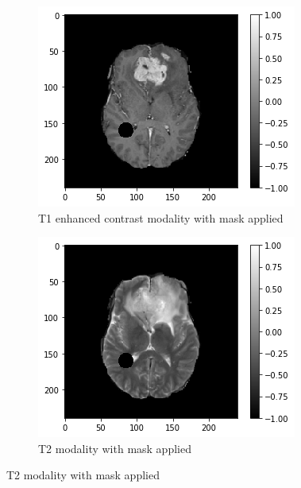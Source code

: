 \begin{figure}[H]
    \centering
    \begin{subfigure}[t]{.33\textwidth}
        \centering
        \includegraphics[width=\linewidth]{chapters/06_hdm/images_masked/masked_1.png}
        \caption{T1 enhanced contrast modality with mask applied}
    \end{subfigure}%
    \begin{subfigure}[t]{.33\textwidth}
        \centering
        \includegraphics[width=\linewidth]{chapters/06_hdm/images_masked/masked_2.png}
        \caption{T2 modality with mask applied}
    \end{subfigure}

\end{figure}
